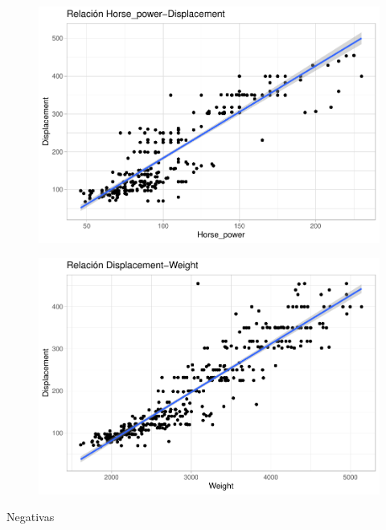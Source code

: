 \begin{figure}[H]\includegraphics[width=.9\linewidth]{img/EDA_files/figure-latex/unnamed-chunk-21-1} \caption{}\end{figure}
\begin{figure}[H]\includegraphics[width=.9\linewidth]{img/EDA_files/figure-latex/unnamed-chunk-21-2} \caption{}\end{figure}

Negativas

